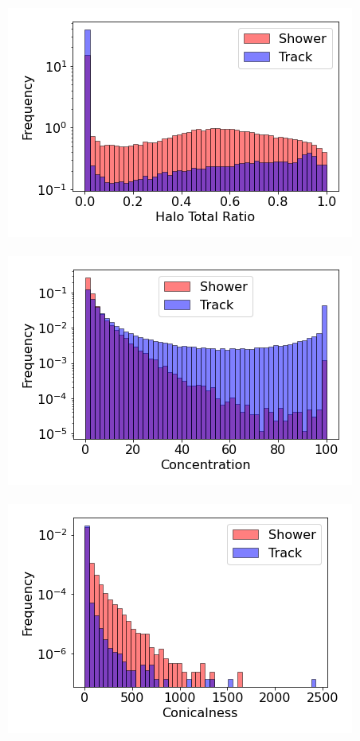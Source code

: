 \begin{figure}[hb!]
        \centering
        \begin{subfigure}[b]{0.45\textwidth}
            \centering
            \includegraphics[width=\textwidth]{Feature_Halo_Total_Ratio}
            \caption{}%
        \end{subfigure}
        \hfill
        \begin{subfigure}[b]{0.45\textwidth}  
            \centering 
            \includegraphics[width=\textwidth]{Feature_Concentration}
            \caption{}%
        \end{subfigure}
        \hfill
        \begin{subfigure}[b]{0.45\textwidth}  
            \centering 
            \includegraphics[width=\textwidth]{Feature_Conicalness}

\end{subfigure}
\end{figure}

